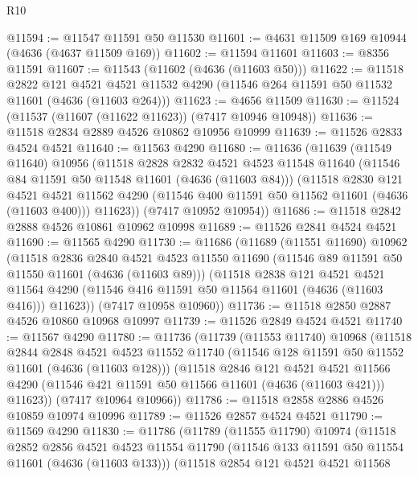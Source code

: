 \begin{lexlean}{R10}
\begin{coremodule}
@11594 := @11547 @11591 @50 @11530
@11601 := @4631 @11509 @169 @10944 (@4636 (@4637 @11509 @169))
@11602 := @11594 @11601
@11603 := @8356 @11591
@11607 := @11543 (@11602 (@4636 (@11603 @50)))
@11622 := @11518
    @2822
    @121
    @4521
    @4521
    @11532
    @4290
    (@11546 @264 @11591 @50 @11532 @11601 (@4636 (@11603 @264)))
@11623 := @4656 @11509
@11630 := @11524 (@11537 (@11607 (@11622 @11623)) (@7417 @10946 @10948))
@11636 := @11518 @2834 @2889 @4526 @10862 @10956 @10999
@11639 := @11526 @2833 @4524 @4521
@11640 := @11563 @4290
@11680 := @11636
    (@11639
      (@11549 @11640)
      @10956
      (@11518
        @2828
        @2832
        @4521
        @4523
        @11548
        @11640
        (@11546 @84 @11591 @50 @11548 @11601 (@4636 (@11603 @84)))
        (@11518
          @2830
          @121
          @4521
          @4521
          @11562
          @4290
          (@11546 @400 @11591 @50 @11562 @11601 (@4636 (@11603 @400)))
          @11623))
      (@7417 @10952 @10954))
@11686 := @11518 @2842 @2888 @4526 @10861 @10962 @10998
@11689 := @11526 @2841 @4524 @4521
@11690 := @11565 @4290
@11730 := @11686
    (@11689
      (@11551 @11690)
      @10962
      (@11518
        @2836
        @2840
        @4521
        @4523
        @11550
        @11690
        (@11546 @89 @11591 @50 @11550 @11601 (@4636 (@11603 @89)))
        (@11518
          @2838
          @121
          @4521
          @4521
          @11564
          @4290
          (@11546 @416 @11591 @50 @11564 @11601 (@4636 (@11603 @416)))
          @11623))
      (@7417 @10958 @10960))
@11736 := @11518 @2850 @2887 @4526 @10860 @10968 @10997
@11739 := @11526 @2849 @4524 @4521
@11740 := @11567 @4290
@11780 := @11736
    (@11739
      (@11553 @11740)
      @10968
      (@11518
        @2844
        @2848
        @4521
        @4523
        @11552
        @11740
        (@11546 @128 @11591 @50 @11552 @11601 (@4636 (@11603 @128)))
        (@11518
          @2846
          @121
          @4521
          @4521
          @11566
          @4290
          (@11546 @421 @11591 @50 @11566 @11601 (@4636 (@11603 @421)))
          @11623))
      (@7417 @10964 @10966))
@11786 := @11518 @2858 @2886 @4526 @10859 @10974 @10996
@11789 := @11526 @2857 @4524 @4521
@11790 := @11569 @4290
@11830 := @11786
    (@11789
      (@11555 @11790)
      @10974
      (@11518
        @2852
        @2856
        @4521
        @4523
        @11554
        @11790
        (@11546 @133 @11591 @50 @11554 @11601 (@4636 (@11603 @133)))
        (@11518
          @2854
          @121
          @4521
          @4521
          @11568

\end{coremodule}
\end{lexlean}
